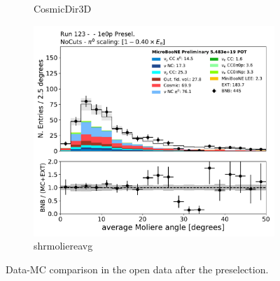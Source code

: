 \begin{figure}[H]
\begin{center}
\begin{subfigure}[b]{0.3\textwidth}
    \caption{\label{fig:1e0p:dataMCRun1:CosmicIP} CosmicDir3D }
    \end{subfigure}
    \begin{subfigure}[b]{0.3\textwidth}
    \centering
    \includegraphics[width=1.00\textwidth]{1e0p/dataMCRun123/shrmoliereavg.pdf}
    \caption{\label{fig:1e0p:dataMCRun1:shrmoliereavg} shrmoliereavg }
    \end{subfigure}
\caption{\label{fig:1e0p:dataMCRun1:cosmic}Data-MC comparison in the open data after the \zpsel preselection.}
\end{center}
\end{figure}

